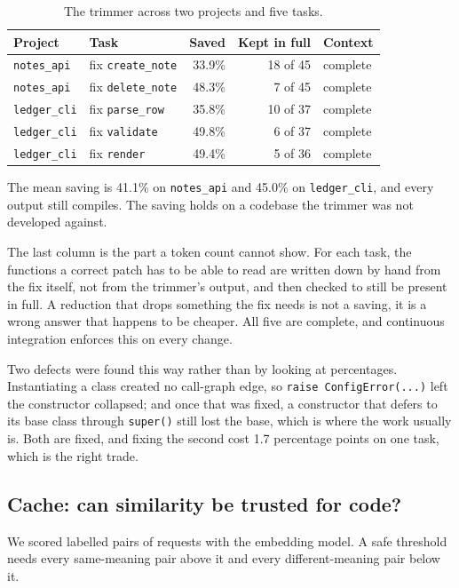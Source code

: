 \documentclass[12pt, a4paper, oneside]{report}
\newcommand{\code}[1]{\texttt{#1}}
\begin{document}
\begin{table}[H]
\centering
\begin{tabular}{llrrl}
\toprule
Project & Task & Saved & Kept in full & Context \\
\midrule
\code{notes\_api}  & fix \code{create\_note} & 33.9\% & 18 of 45 & complete \\
\code{notes\_api}  & fix \code{delete\_note} & 48.3\% &  7 of 45 & complete \\
\code{ledger\_cli} & fix \code{parse\_row}   & 35.8\% & 10 of 37 & complete \\
\code{ledger\_cli} & fix \code{validate}     & 49.8\% &  6 of 37 & complete \\
\code{ledger\_cli} & fix \code{render}       & 49.4\% &  5 of 36 & complete \\
\bottomrule
\end{tabular}
\caption{The trimmer across two projects and five tasks.}
\label{tab:projects}
\end{table}

The mean saving is 41.1\% on \code{notes\_api} and 45.0\% on \code{ledger\_cli},
and every output still compiles. The saving holds on a codebase the trimmer was
not developed against.

The last column is the part a token count cannot show. For each task, the
functions a correct patch has to be able to read are written down by hand from
the fix itself, not from the trimmer's output, and then checked to still be
present in full. A reduction that drops something the fix needs is not a
saving, it is a wrong answer that happens to be cheaper. All five are complete,
and continuous integration enforces this on every change.

Two defects were found this way rather than by looking at percentages.
Instantiating a class created no call-graph edge, so \code{raise
ConfigError(...)} left the constructor collapsed; and once that was fixed, a
constructor that defers to its base class through \code{super()} still lost the
base, which is where the work usually is. Both are fixed, and fixing the second
cost 1.7 percentage points on one task, which is the right trade.

\subsection{Cache: can similarity be trusted for code?}
\label{sec:cache-results}

We scored labelled pairs of requests with the embedding model. A safe threshold
needs every same-meaning pair above it and every different-meaning pair below it.
\end{document}
